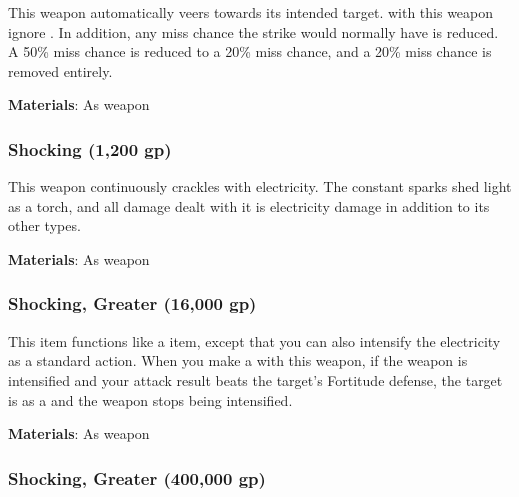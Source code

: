 This weapon automatically veers towards its intended target.
 with this weapon ignore .
In addition, any miss chance the strike would normally have is reduced.
A 50\% miss chance is reduced to a 20\% miss chance, and a 20\% miss chance is removed entirely.



\vspace{0.25em}
\textbf{Materials}: As weapon


\lowercase{\hypertarget{item:Shocking}{}}\label{item:Shocking}
\hypertarget{item:Shocking}{\subsubsection{Shocking\hfill{} (1,200 gp)}}

This weapon continuously crackles with electricity.
The constant sparks shed light as a torch, and all damage dealt with it is electricity damage in addition to its other types.



\vspace{0.25em}
\textbf{Materials}: As weapon


\lowercase{\hypertarget{item:Shocking, Greater}{}}\label{item:Shocking, Greater}
\hypertarget{item:Shocking, Greater}{\subsubsection{Shocking, Greater\hfill{} (16,000 gp)}}

This item functions like a  item, except that you can also intensify the electricity as a standard action.
When you make a  with this weapon, if the weapon is intensified and your attack result beats the target's Fortitude defense,
the target is \dazed as a  and the weapon stops being intensified.



\vspace{0.25em}
\textbf{Materials}: As weapon


\lowercase{\hypertarget{item:Shocking, Greater}{}}\label{item:Shocking, Greater}
\hypertarget{item:Shocking, Greater}{\subsubsection{Shocking, Greater\hfill{} (400,000 gp)}}

